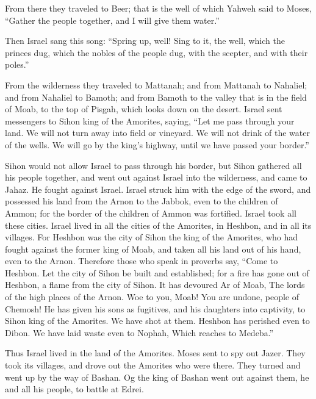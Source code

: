  From there they traveled to Beer; that is the well of
which Yahweh said to Moses, ``Gather the people together, and I will
give them water.''

 Then Israel sang this song: ``Spring up, well! Sing to it,
 the well, which the princes dug, which the nobles of the
people dug, with the scepter, and with their poles.''

From the wilderness they traveled to Mattanah;  and from
Mattanah to Nahaliel; and from Nahaliel to Bamoth;  and
from Bamoth to the valley that is in the field of Moab, to the top of
Pisgah, which looks down on the desert.  Israel sent
messengers to Sihon king of the Amorites, saying,  ``Let me
pass through your land. We will not turn away into field or vineyard. We
will not drink of the water of the wells. We will go by the king's
highway, until we have passed your border.''

 Sihon would not allow Israel to pass through his border,
but Sihon gathered all his people together, and went out against Israel
into the wilderness, and came to Jahaz. He fought against Israel.
 Israel struck him with the edge of the sword, and
possessed his land from the Arnon to the Jabbok, even to the children of
Ammon; for the border of the children of Ammon was fortified.
 Israel took all these cities. Israel lived in all the
cities of the Amorites, in Heshbon, and in all its villages.
 For Heshbon was the city of Sihon the king of the
Amorites, who had fought against the former king of Moab, and taken all
his land out of his hand, even to the Arnon.  Therefore
those who speak in proverbs say, ``Come to Heshbon. Let the city of
Sihon be built and established;  for a fire has gone out of
Heshbon, a flame from the city of Sihon. It has devoured Ar of Moab, The
lords of the high places of the Arnon.  Woe to you, Moab!
You are undone, people of Chemosh! He has given his sons as fugitives,
and his daughters into captivity, to Sihon king of the Amorites.
 We have shot at them. Heshbon has perished even to Dibon.
We have laid waste even to Nophah, Which reaches to Medeba.''

 Thus Israel lived in the land of the Amorites.
 Moses sent to spy out Jazer. They took its villages, and
drove out the Amorites who were there.  They turned and
went up by the way of Bashan. Og the king of Bashan went out against
them, he and all his people, to battle at Edrei.

